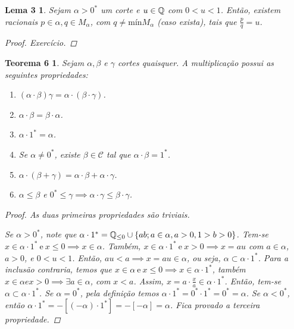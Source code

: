 \documentclass[a4paper,12pt]{article}
\newtheorem*{t6}{Teorema 6}
\newtheorem*{l3}{Lema 3}
\begin{document}
\bigskip


	\begin{l3}
		
		Sejam $\alpha > 0^*$ um corte e $u \in \Bbb Q$ com $0 < u < 1$. Então, existem racionais $p \in \alpha, q \in M_{\alpha}$, com $q \neq \text{mín}M_{\alpha}$ (caso exista), tais que $\frac{p}{q} = u$.
		
		\begin{proof}
			
			Exercício.
			
		\end{proof}
		
	\end{l3}

	\begin{t6}
		
		Sejam $\alpha, \beta$ e $\gamma$ cortes quaisquer. A multiplicação possui as seguintes propriedades:
		
		\begin{enumerate}
			
			\item $(\alpha \cdot \beta)\gamma = \alpha \cdot (\beta \cdot \gamma)$.
			\item $\alpha \cdot \beta = \beta \cdot \alpha$.
			\item $\alpha \cdot 1^* = \alpha$.
			\item Se $\alpha \neq 0^*$, existe $\beta \in \mathcal C$ tal que $\alpha \cdot \beta = 1^*$.
			\item $\alpha \cdot (\beta + \gamma) = \alpha \cdot \beta + \alpha \cdot \gamma$.
			\item $\alpha \leq \beta$ e $0^* \leq \gamma \implies \alpha \cdot \gamma \leq \beta \cdot \gamma$.
			
		\end{enumerate}
	
	\begin{proof}
		
		As duas primeiras propriedades são triviais.
		
		Se $\alpha > 0^*$, note que $\alpha \cdot 1^* = \Bbb Q_{\leq 0} \cup \{ab; a \in \alpha, a > 0, 1 > b > 0\}$. Tem-se $x \in \alpha \cdot 1^* \ \text{e} \ x \leq 0 \implies x \in \alpha$. Também, $x \in \alpha \cdot 1^* \ \text{e} \ x > 0 \implies x = au$ com $a \in \alpha$, $a > 0$, e $0 < u < 1$. Então, $au < a \implies x = au \in \alpha$, ou seja, $\alpha \subset \alpha \cdot 1^*$. Para a inclusão contraria, temos que $x \in \alpha \ \text{e} \ x \leq 0 \implies x \in \alpha \cdot 1^*$, também $x \in \alpha e x > 0 \implies \exists a \in \alpha$, com $x < a$. Assim, $x = a \cdot \frac{x}{a} \in \alpha \cdot 1^*$. Então, tem-se $\alpha \subset \alpha \cdot 1^*$. Se $\alpha = 0^*$, pela definição temos $\alpha \cdot 1^* = 0^* \cdot 1^* = 0^* = \alpha$. Se $\alpha < 0^*$, então $\alpha \cdot 1^* = -[(-\alpha) \cdot 1^*] = -[-\alpha] = \alpha$. Fica provado a terceira propriedade.
		

\end{proof}
\end{t6}
\end{document}
